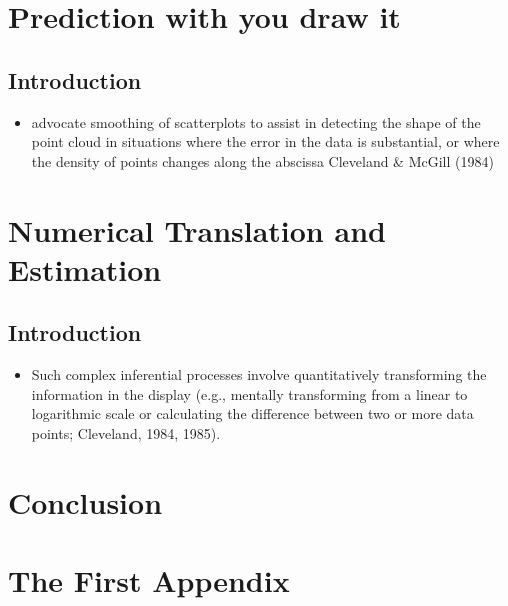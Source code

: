 \documentclass[print]{nuthesis}
\providecommand{\tightlist}{%
  \setlength{\itemsep}{0pt}\setlength{\parskip}{0pt}}
\begin{document}
\hypertarget{youdrawit}{%
\chapter{Prediction with you draw it}\label{youdrawit}}

\hypertarget{introduction-1}{%
\section{Introduction}\label{introduction-1}}

\begin{itemize}
\tightlist
\item
  advocate smoothing of scatterplots to assist in detecting the shape of the point cloud in situations where the error in the data is substantial, or where the density of points changes along the abscissa Cleveland \& McGill (1984)
\end{itemize}

\hypertarget{estimation}{%
\chapter{Numerical Translation and Estimation}\label{estimation}}

\hypertarget{introduction-2}{%
\section{Introduction}\label{introduction-2}}

\begin{itemize}
\tightlist
\item
  Such complex inferential processes involve quantitatively transforming the information in the display (e.g., mentally transforming from a linear to logarithmic scale or calculating the difference between two or more data points; Cleveland, 1984, 1985).
\end{itemize}

\hypertarget{conclusion}{%
\chapter{Conclusion}\label{conclusion}}

\appendix

\hypertarget{the-first-appendix}{%
\chapter{The First Appendix}\label{the-first-appendix}}
\end{document}
